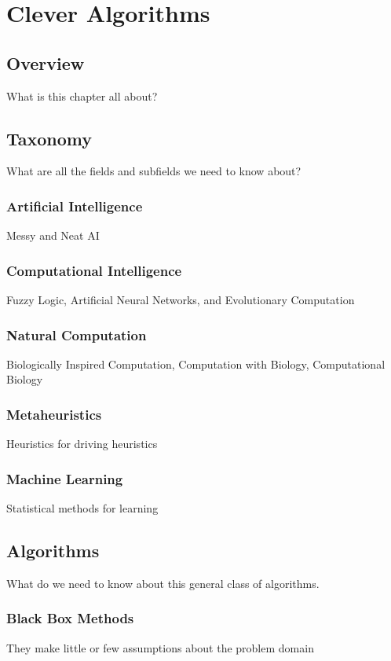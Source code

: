 \chapter{Clever Algorithms}
\label{chap:field}

\section{Overview}
What is this chapter all about?


\section{Taxonomy}
What are all the fields and subfields we need to know about?

\subsection{Artificial Intelligence}
Messy and Neat AI

\subsection{Computational Intelligence}
Fuzzy Logic, Artificial Neural Networks, and Evolutionary Computation

\subsection{Natural Computation}
Biologically Inspired Computation, Computation with Biology, Computational Biology 

\subsection{Metaheuristics}
Heuristics for driving heuristics

\subsection{Machine Learning}
Statistical methods for learning


\section{Algorithms}
What do we need to know about this general class of algorithms.

\subsection{Black Box Methods}
They make little or few assumptions about the problem domain


